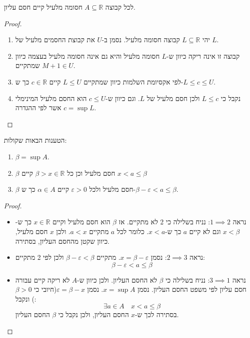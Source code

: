 \documentclass{tstextbook}
\begin{document}
\begin{theorem}
לכל קבוצה \(A\subseteq \mathbb{R}\) חסומה מלעיל קיים חסם עליון.

\end{theorem}
\begin{proof}
  \begin{enumerate}
    \item יהי \(L\subseteq \mathbb{R}\) קבוצה חסומה מלעיל. נסמן ב-\(U\) את קבוצת החסמים מלעיל של \(L\). 


    \item קבוצה זו אינה ריקה כיוון ש-\(L\) חסומה מלעיל והיא גם אינה חסומה מלעיל בעצמה כיוון שמתקיים \(M+1 \in U\). 


    \item לפי אקסיומת השלמות כיוון שמתקיים \(L\leq U\) קיים \(c \in \mathbb{R}\) כך ש-\(L\leq c\leq U\). 


    \item נקבל כי \(L\leq c\) ולכן חסם מלעיל של \(L\). וגם כיוון ש-\(c\leq U\) הוא החסם מלעיל המינימלי אשר לפי ההגדרה \(c=\sup L\). 


  \end{enumerate}
\end{proof}
\begin{proposition}
הטענות הבאות שקולות:

  \begin{enumerate}
    \item \(\beta=\sup A\). 


    \item \(\beta\) חסם מלעיל וכן כל \(\beta > x \in\mathbb{R}\) קיים \(x<a \leq \beta\)


    \item \(\beta\) חסם מלעיל ולכל \(\varepsilon>0\) קיים \(\alpha \in A\) כך ש-\(\beta-\varepsilon < a\leq \beta\). 


  \end{enumerate}
\end{proposition}
\begin{proof}
  \begin{itemize}
    \item נראה \(1\implies 2\):
נניח בשלילה כי 2 לא מתקיים. אז \(\beta\) הוא חסם מלעיל וקיים \(x \in \mathbb{R}\) כך ש-\(x<\beta\) וגם לא קיים \(a\) כך ש-\(x<a\). כלומר לכל \(a\) מתקיים \(a<x\). ולכן \(x\) חסם מלעיל, כיוון שקטן מהחסם העליון, בסתירה.
    \item נראה \(2\implies 3\):
נסמן \(x=\beta-\varepsilon\). מתקיים \(\beta-\varepsilon<\beta\) ולכן לפי 2 מתקיים:
$$\beta-\varepsilon<a\leq \beta$$
    \item נראה \(3\implies 1\):
נניח בשלילה כי \(\beta\) לא החסם העליון. ולכן כיוון ש-\(A\) לא ריקה קיים עבורה חסם עליון לפי משפט החסם העליון. נסמן \(x = \sup A\). נסמן \(\varepsilon=\beta-x\)(חיובי כי \(\beta>0\)) ונקבל:
$$\exists a \in A\quad x<a\leq \beta$$
בסתירה לכך ש-\(x\) החסם העליון, ולכן נקבל כי \(\beta\) החסם העליון.
  \end{itemize}
\end{proof}
\end{document}
